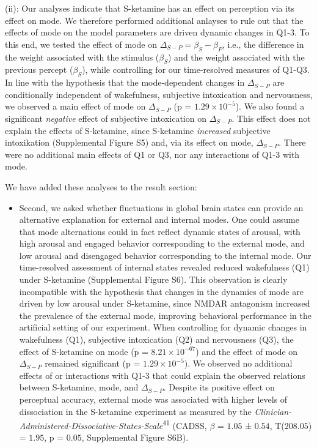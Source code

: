\documentclass[
]{article}
\providecommand{\tightlist}{%
  \setlength{\itemsep}{0pt}\setlength{\parskip}{0pt}}
\begin{document}
(ii): Our analyses indicate that S-ketamine has an effect on perception
via its effect on mode. We therefore performed additional anlayses to
rule out that the effects of mode on the model parameters are driven
dynamic changes in Q1-3. To this end, we tested the effect of mode on
\(\Delta_{S-P} = \beta_S - \beta_P\), i.e., the difference in the weight
associated with the stimulus (\(\beta_S\)) and the weight associated
with the previous percept (\(\beta_S\)), while controlling for our
time-resolved measures of Q1-Q3. In line with the hypothesis that the
mode-dependent changes in \(\Delta_{S-P}\) are conditionally independent
of wakefulness, subjective intoxication and nervousness, we observed a
main effect of mode on \(\Delta_{S-P}\) (p =
\(\ensuremath{1.29\times 10^{-5}}\)). We also found a significant
\emph{negative} effect of subjective intoxication on \(\Delta_{S-P}\).
This effect does not explain the effects of S-ketamine, since S-ketamine
\emph{increased} subjective intoxikation (Supplemental Figure S5) and,
via its effect on mode, \(\Delta_{S-P}\). There were no additional main
effects of Q1 or Q3, nor any interactions of Q1-3 with mode.

We have added these analyses to the result section:

\begin{itemize}
\tightlist
\item
  Second, we asked whether fluctuations in global brain states can
  provide an alternative explanation for external and internal modes.
  One could assume that mode alternations could in fact reflect dynamic
  states of arousal, with high arousal and engaged behavior
  corresponding to the external mode, and low arousal and disengaged
  behavior corresponding to the internal mode. Our time-resolved
  assessment of internal states revealed reduced wakefulness (Q1) under
  S-ketamine (Supplemental Figure S6). This observation is clearly
  incompatible with the hypothesis that changes in the dynamics of mode
  are driven by low arousal under S-ketamine, since NMDAR antagonism
  increased the prevalence of the external mode, improving behavioral
  performance in the artificial setting of our experiment. When
  controlling for dynamic changes in wakefulness (Q1), subjective
  intoxication (Q2) and nervousness (Q3), the effect of S-ketamine on
  mode (p = \(\ensuremath{8.21\times 10^{-67}}\)) and the effect of mode
  on \(\Delta_{S-P}\) remained significant (p =
  \(\ensuremath{1.29\times 10^{-5}}\)). We observed no additional
  effects of or interactions with Q1-3 that could explain the observed
  relations between S-ketamine, mode, and \(\Delta_{S-P}\). Despite its
  positive effect on perceptual accuracy, external mode was associated
  with higher levels of dissociation in the S-ketamine experiment as
  measured by the
  \emph{Clinician-Administered-Dissociative-States-Scale}\textsuperscript{41}
  (CADSS, \(\beta\) = \(1.05\) ± \(0.54\), T(\(208.05\)) = \(1.95\), p =
  \(0.05\), Supplemental Figure S6B).
\end{itemize}
\end{document}
